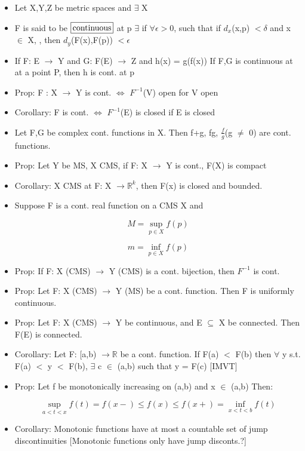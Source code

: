 \documentclass[a4paper]{article}
\newcommand{\boxinate}[1]{\framebox[1.1\width]{#1}}
\begin{document}
\begin{itemize}

\item Let X,Y,Z be metric spaces and $\exists$  X

\item F is said to be $\boxinate{continuous}$ at p $\exists$ if $\forall \epsilon >$0,  such that if $d_{x}$(x,p) $< \delta$ and x $\in$ X, , then $d_y$(F(x),F(p)) $< \epsilon$


\item If F: E $\rightarrow$  Y and G: F(E) $\rightarrow$ Z and h(x) = g(f(x))
  If F,G is continuous at at a point P, then h is cont. at p



\item Prop: F : X $\rightarrow$ Y is cont. $\iff$ $F^{-1}$(V) open for V open


\item Corollary: F is cont. $\iff$ $F^{-1}$(E) is closed if E is closed

\item Let F,G be complex cont. functions in X. Then f+g, fg, $\frac{f}{g}$(g $\neq$ 0)    are cont. functions.


\item Prop: Let Y be MS, X CMS, if F: X $\rightarrow$ Y is cont., F(X) is compact


\item Corollary: X CMS at F: X $\rightarrow \mathbb{R}^k$, then F(x) is closed and bounded.

\item Suppose F is a cont. real function on a CMS X and

  $$M = \sup_{p \in X}f(p)$$

  $$m = \inf_{p \in X}f(p)$$

\item Prop: If F: X (CMS) $\rightarrow$ Y (CMS) is a cont. bijection, then $F^{-1}$ is cont.

\item Prop: Let F: X (CMS) $\rightarrow$ Y (MS) be a cont. function. Then F is uniformly continuous.

\item Prop: Let F: X (CMS) $\rightarrow$ Y be continuous, and E $\subseteq$ X be connected. Then F(E) is connected.

\item Corollary: Let F: [a,b) $\rightarrow \mathbb{R}$ be a cont. function. If F(a) $<$ F(b) then $\forall$ y s.t. F(a) $<$ y $<$ F(b), $\exists$ c  $\in$ (a,b) such that y = F(c) [IMVT]

\item Prop: Let f be monotonically increasing on (a,b) and x $\in$ (a,b) Then:

  $$ \sup_{a < t < x} f(t) = f(x-) \leq f(x) \leq f(x+) = \inf_{x < t < b} f(t) $$

\item Corollary: Monotonic functions have at most a countable set of jump discontinuities [Monotonic functions only have jump disconts.?]








\end{itemize}
\end{document}
